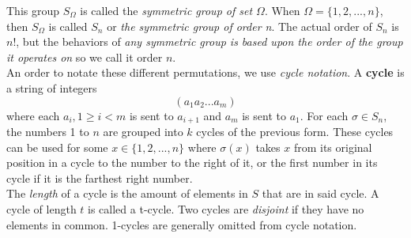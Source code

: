 \documentclass[12pt,letterpaper]{article}
\begin{document}
This group $S_{\Omega}$ is called the \textit{symmetric group of set $\Omega$}. When $\Omega = \{1, 2, ..., n\}$, then $S_{\Omega}$ is called $S_{n}$ or \textit{the symmetric group of order n}. The actual order of $S_{n}$ is $n!$, but the behaviors of \textit{any symmetric group is based upon the order of the group it operates on} so we call it order $n$. \\

An order to notate these different permutations, we use \textit{cycle notation}. A \textbf{cycle} is a string of integers $$(a_{1}a_{2}...a_{m})$$ where each $a_{i},  1 \geq i < m$ is sent to $a_{i + 1}$ and $a_{m}$ is sent to $a_{1}$. For each $\sigma \in S_{n}$, the numbers 1 to $n$ are grouped into $k$ cycles of the previous form. These cycles can be used for some $x \in \{1, 2, ..., n\}$ where $\sigma(x)$ takes $x$ from its original position in a cycle to the number to the right of it, or the first number in its cycle if it is the farthest right number. \\

The \textit{length} of a cycle is the amount of elements in $S$ that are in said cycle. A cycle of length $t$ is called a t-cycle. Two cycles are \textit{disjoint} if they have no elements in common. 1-cycles are generally omitted from cycle notation.
\end{document}

